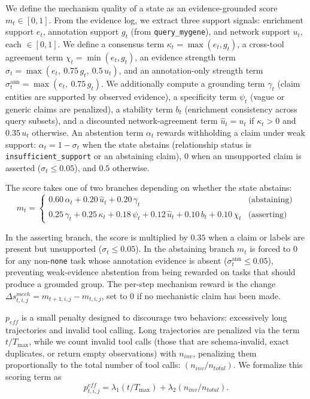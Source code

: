 \documentclass[thesis,letterpaper,12pt]{utthesis}
\begin{document}
We define the mechanism quality of a state as an evidence-grounded score $m_t \in [0,1]$. From the evidence log, we extract three support signals: enrichment support $e_t$, annotation support $g_t$ (from \texttt{query\_mygene}), and network support $u_t$, each $\in [0,1]$. We define a consensus term $\kappa_t = \max(e_t, g_t)$, a cross-tool agreement term $\chi_t = \min(e_t, g_t)$, an evidence strength term $\sigma_t = \max(e_t,\ 0.75\,g_t,\ 0.5\,u_t)$, and an annotation-only strength term $\sigma^{\text{ann}}_t = \max(e_t,\ 0.75\,g_t)$. We additionally compute a grounding term $\gamma_t$ (claim entities are supported by observed evidence), a specificity term $\psi_t$ (vague or generic claims are penalized), a stability term $b_t$ (enrichment consistency across query subsets), and a discounted network-agreement term $\hat{u}_t = u_t$ if $\kappa_t > 0$ and $0.35\,u_t$ otherwise. An abstention term $\alpha_t$ rewards withholding a claim under weak support: $\alpha_t = 1 - \sigma_t$ when the state abstains (relationship status is \texttt{insufficient\_support} or an abstaining claim), $0$ when an unsupported claim is asserted ($\sigma_t \le 0.05$), and $0.5$ otherwise.

The score takes one of two branches depending on whether the state abstains:
\[
    m_t = \begin{cases}
        0.60\,\alpha_t + 0.20\,\hat{u}_t + 0.20\,\gamma_t & \text{(abstaining)} \\[4pt]
        0.25\,\gamma_t + 0.25\,\kappa_t + 0.18\,\psi_t + 0.12\,\hat{u}_t + 0.10\,b_t + 0.10\,\chi_t & \text{(asserting)}
    \end{cases}
\]

In the asserting branch, the score is multiplied by $0.35$ when a claim or labels are present but unsupported ($\sigma_t \le 0.05$). In the abstaining branch $m_t$ is forced to $0$ for any non-\texttt{none} task whose annotation evidence is absent ($\sigma^{\text{ann}}_t \le 0.05$), preventing weak-evidence abstention from being rewarded on tasks that should produce a grounded group. The per-step mechanism reward is the change $\Delta s^{mech}_{t,i,j} = m_{t+1,i,j} - m_{t,i,j}$, set to $0$ if no mechanistic claim has been made.

$p_{eff}$ is a small penalty designed to discourage two behaviors: excessively long trajectories and invalid tool calling. Long trajectories are penalized via the term $t / T_{\max}$, while we count invalid tool calls (those that are schema-invalid, exact duplicates, or return empty observations) with $n_{inv}$, penalizing them proportionally to the total number of tool calls: $(n_{inv} / n_{total})$. We formalize this scoring term as
\begin{equation}\label{eqn:eff-pen}
    p^{eff}_{t,i,j} = \lambda_1 (t / T_{\max}) + \lambda_2(n_{inv} / n_{total}).
\end{equation}
\end{document}
